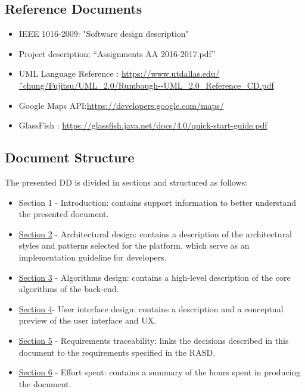 \subsection{Reference Documents}
\begin{itemize}
		\item IEEE 1016-2009: "Software design description"
		\item Project description: “Assignments AA 2016-2017.pdf”
	
	 	\item UML Language Reference : \url{https://www.utdallas.edu/˜chung/Fujitsu/UML_2.0/Rumbaugh--UML_2.0_Reference_CD.pdf}
	 	\item Google Maps API:\url {https://developers.google.com/maps/}
	 	\item GlassFish : \url {https://glassfish.java.net/docs/4.0/quick-start-guide.pdf}
	\end{itemize}
	

\subsection{Document Structure}
The presented DD is divided in sections and structured as follows:
\begin{itemize}
\item Section 1 - Introduction: contains support information to better understand
the presented document.
\item \hyperref[sec:sec2]{Section 2} - Architectural design: contains a description of the architectural
styles and patterns selected for the platform, which serve as an
implementation guideline for developers.
\item \hyperref[sec:sec3]{Section 3} - Algorithms design: contains a high-level description of the
core algorithms of the back-end.
\item \hyperref[sec:sec4]{Section 4}- User interface design: contains a description and a conceptual
preview of the user interface and UX.
\item \hyperref[sec:sec5]{Section 5} - Requirements traceability: links the decisions described in
this document to the requirements specified in the RASD.
\item \hyperref[sec:sec6]{Section 6} - Effort spent: contains a summary of the hours spent
in producing the document.
\end{itemize}